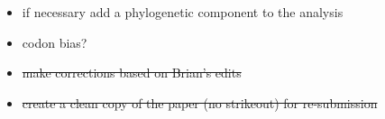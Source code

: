 \documentclass[12pt]{article}
\newcommand{\strep}{\textit{Streptomyces}\xspace}
\begin{document}
\begin{itemize}
%	
%	
%	
	\item if necessary add a phylogenetic component to the analysis
%	
%	
%	
%	
	
	\item codon bias?
	
%	
%	
    
    \item \sout{make corrections based on Brian's edits}
    
    \item \sout{create a clean copy of the paper (no strikeout) for re-submission}

	
\end{itemize}
\end{document}
